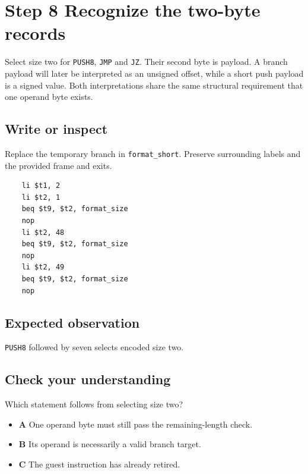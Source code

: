 \section{Step 8 Recognize the two-byte records}\label{vm-s08}

Select size two for \texttt{PUSH8}, \texttt{JMP} and \texttt{JZ}. Their second byte is payload. A branch payload will later be interpreted as an unsigned offset, while a short push payload is a signed value. Both interpretations share the same structural requirement that one operand byte exists.

\subsection{Write or inspect}
Replace the temporary branch in \texttt{format\_short}. Preserve surrounding labels and the provided frame and exits.

\begin{verbatim}
    li $t1, 2
    li $t2, 1
    beq $t9, $t2, format_size
    nop
    li $t2, 48
    beq $t9, $t2, format_size
    nop
    li $t2, 49
    beq $t9, $t2, format_size
    nop
\end{verbatim}
\subsection{Expected observation}
\texttt{PUSH8} followed by seven selects encoded size two.

\subsection{Check your understanding}
Which statement follows from selecting size two?

\begin{itemize}
  \item \textbf{A} One operand byte must still pass the remaining-length check.
  \item \textbf{B} Its operand is necessarily a valid branch target.
  \item \textbf{C} The guest instruction has already retired.
\end{itemize}
